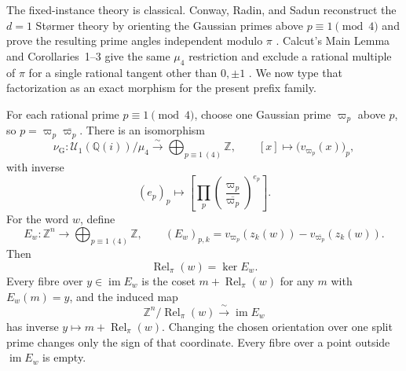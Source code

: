 The fixed-instance theory is classical.  Conway, Radin, and Sadun reconstruct
the $d=1$ St\o rmer theory by orienting the Gaussian primes above
$p\equiv1\pmod4$ and prove the resulting prime angles independent modulo
$\pi$ \cite[Theorems~1--2 and Section~2]{ConwayRadinSadun1999}.  Calcut's
Main Lemma and Corollaries~1--3 give the same $\mu_4$ restriction and exclude
a rational multiple of $\pi$ for a single rational tangent other than
$0,\pm1$ \cite{Calcut2009}.  We now type that factorization as an exact
morphism for the present prefix family.

\begin{theorem}
\label{thm:collatz-machin-fixed-word-kernel}
For each rational prime $p\equiv1\pmod4$, choose one Gaussian prime
$\varpi_p$ above $p$, so $p=\varpi_p\overline{\varpi_p}$.  There is an
isomorphism
\begin{equation}
\label{eq:collatz-machin-gaussian-valuation-isomorphism}
 \nu_{\mathrm G}:\mathcal U_1(\mathbb Q(i))/\mu_4
 \xrightarrow{\ \sim\ }
 \bigoplus_{p\equiv1\ (4)}\mathbb Z,
 \qquad
 [x]\longmapsto\bigl(v_{\varpi_p}(x)\bigr)_p,
\end{equation}
with inverse
\[
 (e_p)_p\longmapsto
 \left[\prod_p
 \left(\frac{\varpi_p}{\overline{\varpi_p}}\right)^{e_p}\right].
\]
For the word $w$, define
\begin{equation}
\label{eq:collatz-machin-signed-valuation-matrix}
 E_w:\mathbb Z^n\longrightarrow
 \bigoplus_{p\equiv1\ (4)}\mathbb Z,
 \qquad
 (E_w)_{p,k}
 =v_{\varpi_p}(z_k(w))-v_{\overline{\varpi_p}}(z_k(w)).
\end{equation}
Then
\begin{equation}
\label{eq:collatz-machin-exact-kernel}
 \operatorname{Rel}_{\pi}(w)=\ker E_w.
\end{equation}
Every fibre over $y\in\operatorname{im}E_w$ is the coset
$m+\operatorname{Rel}_{\pi}(w)$ for any $m$ with $E_w(m)=y$, and the induced
map
\[
 \mathbb Z^n/\operatorname{Rel}_{\pi}(w)
 \xrightarrow{\ \sim\ }\operatorname{im}E_w
\]
has inverse $y\mapsto m+\operatorname{Rel}_{\pi}(w)$.  Changing the chosen
orientation over one split prime changes only the sign of that coordinate.
Every fibre over a point outside $\operatorname{im}E_w$ is empty.
\end{theorem}

